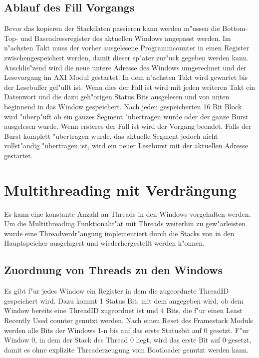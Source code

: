\subsection {Ablauf des Fill Vorgangs}

Bevor das kopieren der Stackdaten passieren kann werden m"ussen die Bottom- Top- und Baseadressregister des aktuellen Windows angepasst werden. Im n"achsten Takt muss der vorher ausgelesene Programmcounter in einen Register zwischengespeichert werden, damit dieser sp"ater zur"uck gegeben werden kann. Anschlie"zend wird die neue untere Adresse des Windows umgerechnet und der Lesevorgang im AXI Modul gestartet. In dem n"achsten Takt wird gewartet bis der Lesebuffer gef"ullt ist. Wenn dies der Fall ist wird mit jeden weiteren Takt ein Datenwort und die dazu geh"origen Status Bits ausgelesen und von unten beginnend in das Window gespeichert. Nach jeden gespeicherten 16 Bit Block wird "uberp"uft ob ein ganzes Segment "ubertragen wurde oder der ganze Burst ausgelesen wurde. Wenn ersteres der Fall ist wird der Vorgang beendet. Falls der Burst komplett "ubertragen wurde, das aktuelle Segment jedoch nicht vollst"andig "ubertragen ist, wird ein neuer Leseburst mit der aktuellen Adresse gestartet. 


\section{Multithreading mit Verdr\"angung}
Es kann eine konstante Anzahl an Threads in den Windows vorgehalten werden. Um die Multithreading Funktionalit"at mit Threads weiterhin zu gew"arleisten wurde eine Threadverdr"angung implementiert durch die Stacks von in den Hauptspeicher ausgelagert und wiederhergestellt werden k"onnen.

\subsection{Zuordnung von Threads zu den Windows}
Es gibt f"ur jedes Window ein Register in dem die zugeordnete ThreadID gespeichert wird. Dazu kommt 1 Status Bit, mit dem angegeben wird, ob dem Window bereits eine ThreadID zugeordnet ist und 4 Bits, die f"ur einen Least Recently Used counter genutzt werden. Nach einen Reset des Framestack Moduls werden alle Bits der Windows 1-n bis auf das erste Statusbit auf 0 gesetzt. F"ur Window 0, in dem der Stack des Thread 0 liegt, wird das erste Bit auf 0 gesetzt, damit es ohne explizite Threaderzeugung vom Bootloader genutzt werden kann.  


